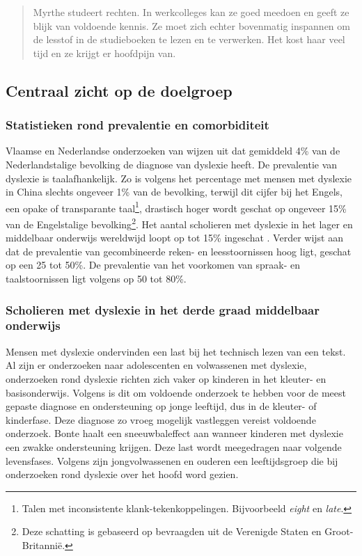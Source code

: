 \begin{quote}
	Myrthe studeert rechten. In werkcolleges kan ze goed meedoen en geeft ze blijk van voldoende kennis. Ze moet zich echter bovenmatig inspannen om de lesstof in de studieboeken te lezen en te verwerken. Het kost haar veel tijd en ze krijgt er hoofdpijn van.
\end{quote}

\subsection{Centraal zicht op de doelgroep}

\subsubsection{Statistieken rond prevalentie en comorbiditeit}

Vlaamse en Nederlandse onderzoeken van \textcite{Wentink2008, Desoete2017} wijzen uit dat gemiddeld 4\% van de Nederlandstalige bevolking de diagnose van dyslexie heeft. De prevalentie van dyslexie is taalafhankelijk. Zo is volgens \textcite{APA2013} het percentage met mensen met dyslexie in China slechts ongeveer 1\% van de bevolking, terwijl dit cijfer bij het Engels, een opake of transparante taal\footnote{Talen met inconsistente klank-tekenkoppelingen. Bijvoorbeeld \textit{eight} en \textit{late}.}, drastisch hoger wordt geschat op ongeveer 15\% van de Engelstalige bevolking\footnote{Deze schatting is gebaseerd op bevraagden uit de Verenigde Staten en Groot-Britannië.}. Het aantal scholieren met dyslexie in het lager en middelbaar onderwijs wereldwijd loopt op tot 15\% ingeschat \autocite{Bonte2020, VanDerMeer2022}. Verder wijst \textcite{Desoete2015} aan dat de prevalentie van gecombineerde reken- en leesstoornissen hoog ligt, geschat op een 25 tot 50\%. De prevalentie van het voorkomen van spraak- en taalstoornissen ligt volgens \textcite{Dirks2008, Desoete2017} op 50 tot 80\%. 


\subsubsection{Scholieren met dyslexie in het derde graad middelbaar onderwijs}

Mensen met dyslexie ondervinden een last bij het technisch lezen van een tekst. Al zijn er onderzoeken naar adolescenten en volwassenen met dyslexie, onderzoeken rond dyslexie richten zich vaker op kinderen in het kleuter- en basisonderwijs. Volgens \textcite{Bonte2020} is dit om voldoende onderzoek te hebben voor de meest gepaste diagnose en ondersteuning op jonge leeftijd, dus in de kleuter- of kinderfase. Deze diagnose zo vroeg mogelijk vastleggen vereist voldoende onderzoek. Bonte haalt een sneeuwbaleffect aan wanneer kinderen met dyslexie een zwakke ondersteuning krijgen. Deze last wordt meegedragen naar volgende levensfases. Volgens \textcite{Lissens2020} zijn jongvolwassenen en ouderen een leeftijdsgroep die bij onderzoeken rond dyslexie over het hoofd word gezien.

